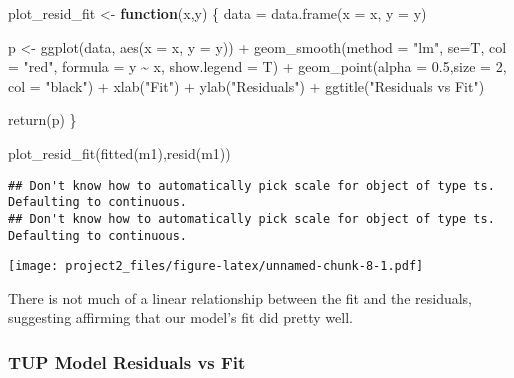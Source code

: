 \documentclass[
  10.5pt,
]{article}
\newenvironment{Shaded}{\begin{snugshade}}{\end{snugshade}}
\newcommand{\AttributeTok}[1]{\textcolor[rgb]{0.77,0.63,0.00}{#1}}
\newcommand{\ControlFlowTok}[1]{\textcolor[rgb]{0.13,0.29,0.53}{\textbf{#1}}}
\newcommand{\DecValTok}[1]{\textcolor[rgb]{0.00,0.00,0.81}{#1}}
\newcommand{\FloatTok}[1]{\textcolor[rgb]{0.00,0.00,0.81}{#1}}
\newcommand{\FunctionTok}[1]{\textcolor[rgb]{0.00,0.00,0.00}{#1}}
\newcommand{\NormalTok}[1]{#1}
\newcommand{\OtherTok}[1]{\textcolor[rgb]{0.56,0.35,0.01}{#1}}
\newcommand{\SpecialCharTok}[1]{\textcolor[rgb]{0.00,0.00,0.00}{#1}}
\newcommand{\StringTok}[1]{\textcolor[rgb]{0.31,0.60,0.02}{#1}}
\begin{document}
\begin{Shaded}
\begin{Highlighting}[]
\NormalTok{plot\_resid\_fit }\OtherTok{\textless{}{-}} \ControlFlowTok{function}\NormalTok{(x,y) \{}
\NormalTok{  data }\OtherTok{=} \FunctionTok{data.frame}\NormalTok{(}\AttributeTok{x =}\NormalTok{ x, }\AttributeTok{y =}\NormalTok{ y)}

\NormalTok{  p }\OtherTok{\textless{}{-}} \FunctionTok{ggplot}\NormalTok{(data, }\FunctionTok{aes}\NormalTok{(}\AttributeTok{x =}\NormalTok{  x, }\AttributeTok{y =}\NormalTok{ y)) }\SpecialCharTok{+}
    \FunctionTok{geom\_smooth}\NormalTok{(}\AttributeTok{method =} \StringTok{"lm"}\NormalTok{, }\AttributeTok{se=}\NormalTok{T,}
                \AttributeTok{col =} \StringTok{"red"}\NormalTok{,}
                \AttributeTok{formula =}\NormalTok{ y }\SpecialCharTok{\textasciitilde{}}\NormalTok{ x,}
                \AttributeTok{show.legend =}\NormalTok{ T) }\SpecialCharTok{+} 
    \FunctionTok{geom\_point}\NormalTok{(}\AttributeTok{alpha =} \FloatTok{0.5}\NormalTok{,}\AttributeTok{size =} \DecValTok{2}\NormalTok{,}
               \AttributeTok{col =} \StringTok{"black"}\NormalTok{) }\SpecialCharTok{+}
    \FunctionTok{xlab}\NormalTok{(}\StringTok{"Fit"}\NormalTok{) }\SpecialCharTok{+} \FunctionTok{ylab}\NormalTok{(}\StringTok{"Residuals"}\NormalTok{) }\SpecialCharTok{+}
    \FunctionTok{ggtitle}\NormalTok{(}\StringTok{"Residuals vs Fit"}\NormalTok{) }
    
  \FunctionTok{return}\NormalTok{(p)}
\NormalTok{\}}

\FunctionTok{plot\_resid\_fit}\NormalTok{(}\FunctionTok{fitted}\NormalTok{(m1),}\FunctionTok{resid}\NormalTok{(m1))}
\end{Highlighting}
\end{Shaded}

\begin{verbatim}
## Don't know how to automatically pick scale for object of type ts. Defaulting to continuous.
## Don't know how to automatically pick scale for object of type ts. Defaulting to continuous.
\end{verbatim}

\texttt{[image: project2\_files/figure-latex/unnamed-chunk-8-1.pdf]}

There is not much of a linear relationship between the fit and the
residuals, suggesting affirming that our model's fit did pretty well.

\hypertarget{tup-model-residuals-vs-fit}{%
\subsubsection{TUP Model Residuals vs
Fit}\label{tup-model-residuals-vs-fit}}
\end{document}
